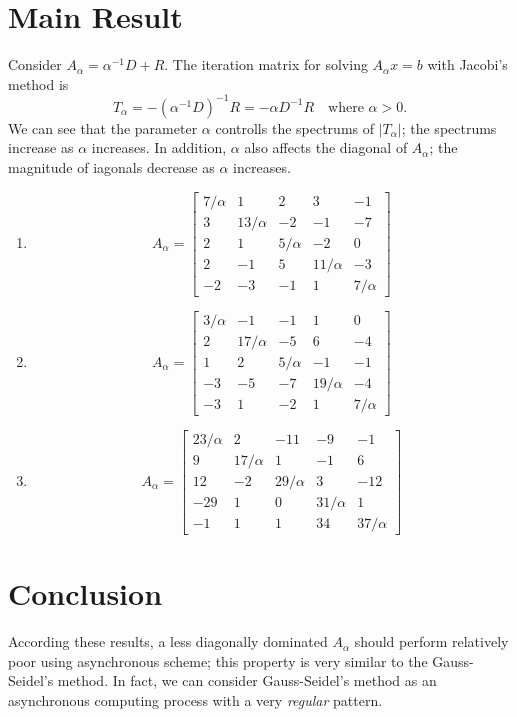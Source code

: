 \documentclass[12pt]{article}
\begin{document}
\section{Main Result}
   Consider $A_{\alpha} = \alpha^{-1} D + R$. The iteration matrix for solving $A_{\alpha} x = b$ with Jacobi's method is
   \[
      T_{\alpha} = - (\alpha^{-1}D)^{-1}R = -\alpha D^{-1}R \quad\text{where $\alpha > 0$.}
   \]
   We can see that the parameter $\alpha$ controlls the spectrums of $|T_{\alpha}|$; the spectrums increase as $\alpha$ increases. In addition, $\alpha$ also affects the diagonal of $A_{\alpha}$; the magnitude of iagonals decrease as $\alpha$ increases. \\[5pt]
   \begin{enumerate}[label=(\roman*)]
   \item
   \[
      A_{\alpha} = 
      \begin{bmatrix}
         7/\alpha &  1 &  2 &  3 & -1\\
         3 & 13/\alpha & -2 & -1 & -7\\
         2 &  1 &  5/\alpha & -2 &  0\\
         2 & -1 &  5 &  11/\alpha & -3\\
        -2 & -3 & -1 &  1 &  7/\alpha
      \end{bmatrix}
   \]
   \item
   \[
      A_{\alpha} = 
      \begin{bmatrix}
         3/\alpha &  -1 & -1 &  1 & 0\\
         2 & 17/\alpha & -5 & 6 & -4\\
         1 &  2 &  5/\alpha & -1 & -1\\
         -3 & -5 & -7 &  19/\alpha & -4\\
        -3 & 1 & -2 &  1 &  7/\alpha
      \end{bmatrix}
   \]
   \item
   \[
      A_{\alpha} = 
      \begin{bmatrix}
         23/\alpha &  2 & -11 & -9 & -1\\
         9 & 17/\alpha & 1 & -1 & 6\\
         12 &  -2 &  29/\alpha & 3 & -12\\
         -29 & 1 & 0 &  31/\alpha & 1\\
        -1 & 1 & 1 &  34 &  37/\alpha
      \end{bmatrix}
   \]
   \end{enumerate}
\section{Conclusion}  
   According these results, a less diagonally dominated $A_{\alpha}$ should perform relatively poor using asynchronous scheme; this property is very similar to the Gauss-Seidel's method. In fact, we can consider Gauss-Seidel's method as an asynchronous computing process with a very \emph{regular} pattern.
\end{document}
